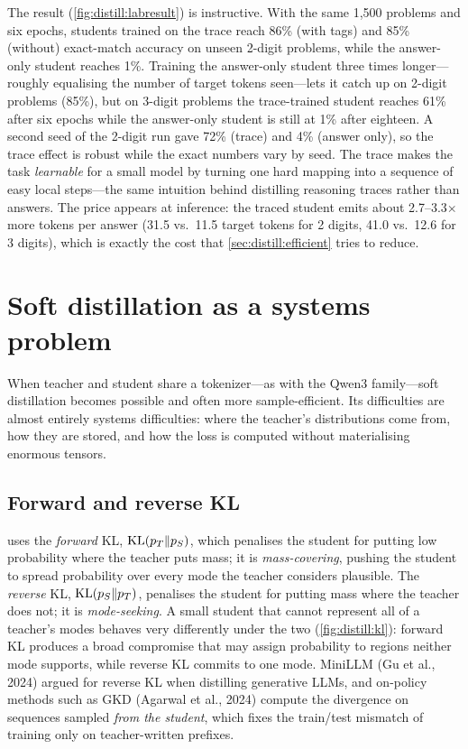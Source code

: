 The result (\cref{fig:distill:labresult}) is instructive. With the same 1{,}500 problems and six
epochs, students trained on the trace reach 86\% (with tags) and 85\% (without) exact-match
accuracy on unseen 2-digit problems, while the answer-only student reaches 1\%. Training the
answer-only student three times longer---roughly equalising the number of target tokens seen---lets
it catch up on 2-digit problems (85\%), but on 3-digit problems the trace-trained student reaches
61\% after six epochs while the answer-only student is still at 1\% after eighteen. A second seed
of the 2-digit run gave 72\% (trace) and 4\% (answer only), so the trace effect is robust while the
exact numbers vary by seed. The trace makes the task \emph{learnable} for a small model by turning
one hard mapping into a sequence of easy local steps---the same intuition behind distilling
reasoning traces rather than answers. The price appears at inference: the traced student emits
about 2.7--3.3$\times$ more tokens per answer (31.5 vs.\ 11.5 target tokens for 2 digits, 41.0 vs.\
12.6 for 3 digits), which is exactly the cost that \cref{sec:distill:efficient} tries to reduce.
\section{Soft distillation as a systems problem}\label{sec:distill:soft}

When teacher and student share a tokenizer---as with the Qwen3 family---soft distillation
becomes possible and often more sample-efficient. Its difficulties are almost entirely systems
difficulties: where the teacher's distributions come from, how they are stored, and how the
loss is computed without materialising enormous tensors.

\subsection{Forward and reverse KL}

 uses the \emph{forward} KL, $\operatorname{KL}(p_T\|p_S)$, which penalises the student
for putting low probability where the teacher puts mass; it is \emph{mass-covering}, pushing the
student to spread probability over every mode the teacher considers plausible. The
\emph{reverse} KL, $\operatorname{KL}(p_S\|p_T)$, penalises the student for putting mass where the teacher
does not; it is \emph{mode-seeking}. A small student that cannot represent all of a teacher's
modes behaves very differently under the two (\cref{fig:distill:kl}): forward KL produces a broad
compromise that may assign probability to regions neither mode supports, while reverse KL
commits to one mode. MiniLLM (Gu et al., 2024) argued for reverse KL when distilling generative
LLMs, and on-policy methods such as GKD (Agarwal et al., 2024) compute the divergence on
sequences sampled \emph{from the student}, which fixes the train/test mismatch of training only
on teacher-written prefixes.

